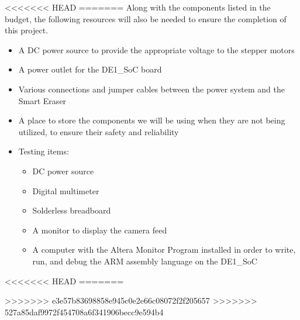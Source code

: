 <<<<<<< HEAD
=======
Along with the components listed in the budget, the following resources will also be needed to ensure the completion of this project.
\begin{itemize}
	\item A DC power source to provide the appropriate voltage to the stepper motors
	\item A power outlet for the DE1\_SoC board
	\item Various connections and jumper cables between the power system and the Smart Eraser
	\item A place to store the components we will be using when they are not being utilized, to ensure their safety and reliability
	\item Testing items:
	\begin{itemize}
		\item DC power source
		\item Digital multimeter
		\item Solderless breadboard
		\item A monitor to display the camera feed
		\item A computer with the Altera Monitor Program installed in order to write, run, and debug the ARM assembly language on the DE1\_SoC
	\end{itemize}
\end{itemize}

<<<<<<< HEAD
=======
\pagebreak

>>>>>>> e3e57b83698858e945c0e2e66c08072f2f205657
>>>>>>> 527a85daf9972f454708a6f341906becc9e594b4
